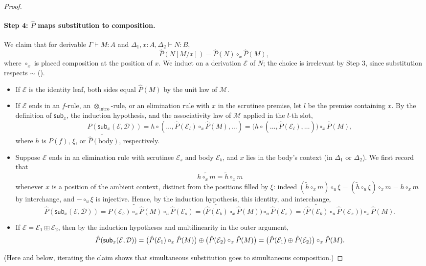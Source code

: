 \begin{proof}
\paragraph{Step 4: $\hat{P}$ maps substitution to composition.}
We claim that for derivable $\Gamma \vdash M : A$ and $\Delta_1, x : A, \Delta_2 \vdash N : B$,
\[
\hat{P}(N[M/x]) = \hat{P}(N) \circ_{x} \hat{P}(M),
\]
where $\circ_x$ is placed composition at the position of $x$.
We induct on a derivation $\mathcal{E}$ of $N$; the choice is irrelevant by Step 3, since substitution respects $\sim$ ().
\begin{itemize}
  \item If $\mathcal{E}$ is the identity leaf, both sides equal $\hat{P}(M)$ by the unit law of $\mathcal{M}$.
  \item If $\mathcal{E}$ ends in an $f$-rule, an $\otimes_{\text{intro}}$-rule, or an elimination rule with $x$ in the scrutinee premise, let $l$ be the premise containing $x$.
  By the definition of $\mathsf{sub}_x$, the induction hypothesis, and the associativity law of $\mathcal{M}$ applied in the $l$-th slot,
  \[
  \hat{P}(\mathsf{sub}_x(\mathcal{E}, \mathcal{D})) = h \circ (\ldots, \hat{P}(\mathcal{E}_l) \circ_x \hat{P}(M), \ldots) = \bigl( h \circ (\ldots, \hat{P}(\mathcal{E}_l), \ldots) \bigr) \circ_x \hat{P}(M),
  \]
  where $h$ is $P(f)$, $\xi$, or $\widetilde{\hat{P}(\text{body})}$, respectively.
  \item Suppose $\mathcal{E}$ ends in an elimination rule with scrutinee $\mathcal{E}_s$ and body $\mathcal{E}_b$, and $x$ lies in the body's context (in $\Delta_1$ or $\Delta_2$).
  We first record that
  \[
  \widetilde{h \circ_x m} = \widetilde{h} \circ_x m
  \]
  whenever $x$ is a position of the ambient context, distinct from the positions filled by $\xi$: indeed $(\widetilde{h} \circ_x m) \circ_u \xi = (\widetilde{h} \circ_u \xi) \circ_x m = h \circ_x m$ by interchange, and $- \circ_u \xi$ is injective.
  Hence, by the induction hypothesis, this identity, and interchange,
  \[
  \hat{P}(\mathsf{sub}_x(\mathcal{E}, \mathcal{D}))
  = \widetilde{\hat{P}(\mathcal{E}_b) \circ_x \hat{P}(M)} \circ_u \hat{P}(\mathcal{E}_s)
  = \bigl( \widetilde{\hat{P}(\mathcal{E}_b)} \circ_x \hat{P}(M) \bigr) \circ_u \hat{P}(\mathcal{E}_s)
  = \bigl( \widetilde{\hat{P}(\mathcal{E}_b)} \circ_u \hat{P}(\mathcal{E}_s) \bigr) \circ_x \hat{P}(M).
  \]
  \item If $\mathcal{E} = \mathcal{E}_1 \boxplus \mathcal{E}_2$, then by the induction hypotheses and multilinearity in the outer argument,
  \[
  \hat{P}(\mathsf{sub}_x(\mathcal{E}, \mathcal{D})) = \bigl( \hat{P}(\mathcal{E}_1) \circ_x \hat{P}(M) \bigr) \mathbin{\oplus} \bigl( \hat{P}(\mathcal{E}_2) \circ_x \hat{P}(M) \bigr) = \bigl( \hat{P}(\mathcal{E}_1) \mathbin{\oplus} \hat{P}(\mathcal{E}_2) \bigr) \circ_x \hat{P}(M).
  \]
\end{itemize}
(Here and below, iterating the claim shows that simultaneous substitution goes to simultaneous composition.)


\end{proof}
